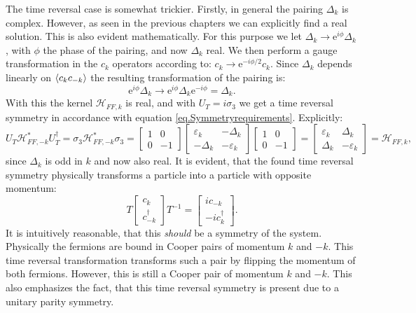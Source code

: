 The time reversal case is somewhat trickier. Firstly, in general the pairing $\Delta_k$ is complex. However, as seen in the previous chapters we can explicitly find a real solution. This is also evident mathematically. For this purpose we let $\Delta_k \to \text{e}^{i\phi}\Delta_k$, with $\phi$ the phase of the pairing, and now $\Delta_k$ real. We then perform a gauge transformation in the $c_k$ operators according to: $c_k \to \text{e}^{-i\phi/2} c_k$. Since $\Delta_k$ depends linearly on $\braket{c_kc_{-k}}$ the resulting transformation of the pairing is:
\begin{equation}
\text{e}^{i\phi}\Delta_k \to \text{e}^{i\phi}\Delta_k\text{e}^{-i\phi} = \Delta_k. \nonumber
\end{equation}
With this the kernel $\mathcal{H}_{FF,k}$ is real, and with $U_T = i\sigma_3$ we get a time reversal symmetry in accordance with equation \ref{eq.Symmetryrequirements}. Explicitly:
\begin{equation}
U_T\mathcal{H}^*_{FF,-k}U^\dagger_T = \sigma_3\mathcal{H}^*_{FF,-k}\sigma_3 = \begin{bmatrix} 1 & 0 \\ 0 & -1 \end{bmatrix}\begin{bmatrix} \varepsilon_k & -\Delta_k \\ -\Delta_k & -\varepsilon_k \end{bmatrix} \begin{bmatrix} 1 & 0 \\ 0 & -1 \end{bmatrix} = \begin{bmatrix} \varepsilon_k & \Delta_k \\ \Delta_k & -\varepsilon_k \end{bmatrix} = \mathcal{H}_{FF,k}, \nonumber
\end{equation}
since $\Delta_k$ is odd in $k$ and now also real. It is evident, that the found time reversal symmetry physically transforms a particle into a particle with opposite momentum:
\begin{equation}
T \begin{bmatrix} c_k \\ c^\dagger_{-k} \end{bmatrix} T^{-1} = \begin{bmatrix} i c_{-k} \\ - i c^\dagger_{k} \end{bmatrix}. \nonumber
\end{equation}
It is intuitively reasonable, that this \textit{should} be a symmetry of the system. Physically the fermions are bound in Cooper pairs of momentum $k$ and $-k$. This time reversal transformation transforms such a pair by flipping the momentum of both fermions. However, this is still a Cooper pair of momentum $k$ and $-k$. This also emphasizes the fact, that this time reversal symmetry is present due to a unitary parity symmetry. 

